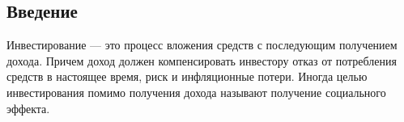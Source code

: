 \subsection*{Введение}

Инвестирование --- это процесс вложения средств с последующим получением дохода. Причем доход должен компенсировать инвестору отказ от потребления средств в настоящее время, риск и инфляционные потери. Иногда целью инвестирования помимо получения дохода называют получение социального эффекта.










